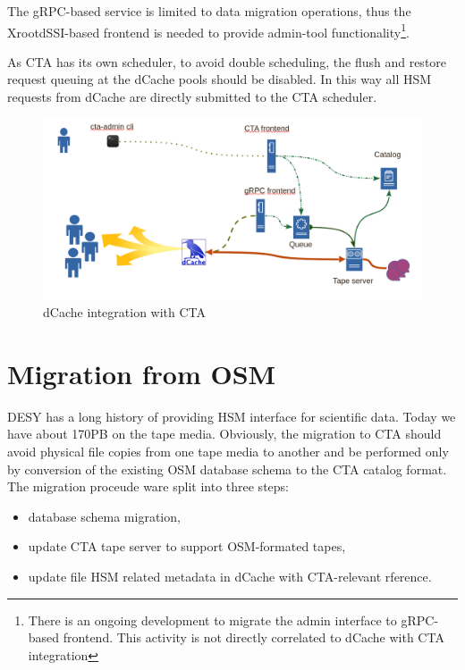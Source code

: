 \documentclass{webofc}
\begin{document}
The gRPC-based service is limited to data migration operations, thus the XrootdSSI-based frontend is needed to provide admin-tool functionality\footnote{There is an ongoing development to migrate the admin interface to gRPC-based\cite{grpc} frontend. This activity is not directly correlated to dCache with CTA integration}.

As CTA has its own scheduler, to avoid double scheduling,  the flush and restore request queuing at the dCache pools should be disabled. In this way all HSM requests from dCache are directly submitted to the CTA scheduler.

\begin{figure}[h]
    \centering
    \includegraphics[scale=0.25]{dcache-cta-integration.png}
    \caption{dCache integration with CTA}
    \label{fig:dcache_integration}
\end{figure}

\section{Migration from OSM}
\label{migraion}

DESY has a long history of providing HSM interface for scientific data. Today we have about 170PB on the tape media. Obviously, the migration to CTA should avoid physical file copies from one tape media to another and be performed only by conversion of the existing OSM database schema to the CTA catalog format. The migration proceude ware split into three steps:
\begin{itemize}
    \item database schema migration,
    \item update CTA tape server to support OSM-formated tapes,
    \item update file HSM related metadata in dCache with CTA-relevant rference.
\end{itemize}
\end{document}
